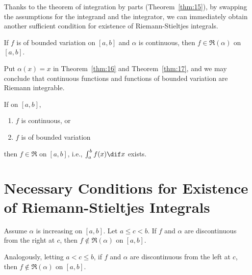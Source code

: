 \documentclass[thmcnt=section, color=blue, 12pt]{my-elegantbook}
\begin{document}
Thanks to the theorem of integration by parts (Theorem~\ref{thm:15}),
by swapping the assumptions for the integrand and the integrator,
we can immediately obtain another sufficient condition for
existence of Riemann-Stieltjes integrals.

\begin{theorem} \label{thm:17}
	If $f$ is of bounded variation on $[a, b]$ and $\alpha$ is continuous,
	then $f \in \mathfrak{R}(\alpha)$ on $[a, b]$.
\end{theorem}

Put $\alpha(x) = x$ in Theorem~\ref{thm:16} and Theorem~\ref{thm:17},
and we may conclude that continuous functions and functions of bounded variation
are Riemann integrable.

\begin{theorem}
	If on $[a, b]$,
	\begin{enumerate}
		\item $f$ is continuous, or
		\item $f$ is of bounded variation
	\end{enumerate}
	then $f \in \mathfrak{R}$ on $[a, b]$, i.e., $\int_a^b f(x) \dif x$ exists.
\end{theorem}



\section{Necessary Conditions for Existence of Riemann-Stieltjes Integrals}

\begin{theorem}
	Assume $\alpha$ is increasing on $[a, b]$.
	Let $a \leq c < b$.
	If $f$ and $\alpha$ are discontinuous from the right at $c$,
	then $f \notin \mathfrak{R}(\alpha)$ on $[a, b]$.

	Analogously, letting $a < c \leq b$,
	if $f$ and $\alpha$ are discontinuous from the left at $c$,
	then $f \notin \mathfrak{R}(\alpha)$ on $[a, b]$.
\end{theorem}
\end{document}
